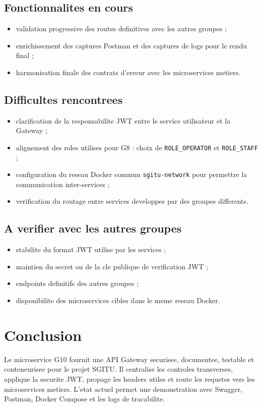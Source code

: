 \documentclass[12pt, a4paper]{article}
\begin{document}
\subsection{Fonctionnalites en cours}

\begin{itemize}
  \item validation progressive des routes definitives avec les autres groupes ;
  \item enrichissement des captures Postman et des captures de logs pour le rendu final ;
  \item harmonisation finale des contrats d'erreur avec les microservices metiers.
\end{itemize}

\subsection{Difficultes rencontrees}

\begin{itemize}
  \item clarification de la responsabilite JWT entre le service utilisateur et la Gateway ;
  \item alignement des roles utilises pour G8 : choix de \texttt{ROLE\_OPERATOR} et \texttt{ROLE\_STAFF} ;
  \item configuration du reseau Docker commun \texttt{sgitu-network} pour permettre la communication inter-services ;
  \item verification du routage entre services developpes par des groupes differents.
\end{itemize}

\subsection{A verifier avec les autres groupes}

\begin{itemize}
  \item stabilite du format JWT utilise par les services ;
  \item maintien du secret ou de la cle publique de verification JWT ;
  \item endpoints definitifs des autres groupes ;
  \item disponibilite des microservices cibles dans le meme reseau Docker.
\end{itemize}

\section{Conclusion}

Le microservice G10 fournit une API Gateway securisee, documentee, testable et conteneurisee pour le projet SGITU. Il centralise les controles transverses, applique la securite JWT, propage les headers utiles et route les requetes vers les microservices metiers. L'etat actuel permet une demonstration avec Swagger, Postman, Docker Compose et les logs de tracabilite.
\end{document}
